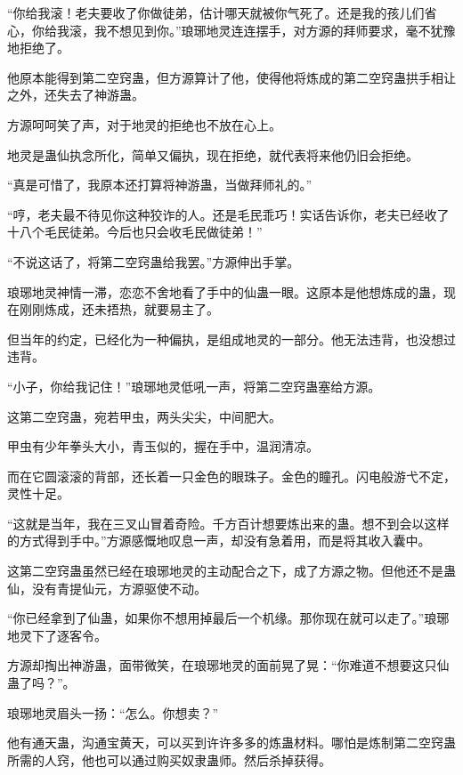 
\begin{this_body}

“你给我滚！老夫要收了你做徒弟，估计哪天就被你气死了。还是我的孩儿们省心，你给我滚，我不想见到你。”琅琊地灵连连摆手，对方源的拜师要求，毫不犹豫地拒绝了。

他原本能得到第二空窍蛊，但方源算计了他，使得他将炼成的第二空窍蛊拱手相让之外，还失去了神游蛊。

方源呵呵笑了声，对于地灵的拒绝也不放在心上。

地灵是蛊仙执念所化，简单又偏执，现在拒绝，就代表将来他仍旧会拒绝。

“真是可惜了，我原本还打算将神游蛊，当做拜师礼的。”

“哼，老夫最不待见你这种狡诈的人。还是毛民乖巧！实话告诉你，老夫已经收了十八个毛民徒弟。今后也只会收毛民做徒弟！”

“不说这话了，将第二空窍蛊给我罢。”方源伸出手掌。

琅琊地灵神情一滞，恋恋不舍地看了手中的仙蛊一眼。这原本是他想炼成的蛊，现在刚刚炼成，还未捂热，就要易主了。

但当年的约定，已经化为一种偏执，是组成地灵的一部分。他无法违背，也没想过违背。

“小子，你给我记住！”琅琊地灵低吼一声，将第二空窍蛊塞给方源。

这第二空窍蛊，宛若甲虫，两头尖尖，中间肥大。

甲虫有少年拳头大小，青玉似的，握在手中，温润清凉。

而在它圆滚滚的背部，还长着一只金色的眼珠子。金色的瞳孔。闪电般游弋不定，灵性十足。

“这就是当年，我在三叉山冒着奇险。千方百计想要炼出来的蛊。想不到会以这样的方式得到手中。”方源感慨地叹息一声，却没有急着用，而是将其收入囊中。

这第二空窍蛊虽然已经在琅琊地灵的主动配合之下，成了方源之物。但他还不是蛊仙，没有青提仙元，方源驱使不动。

“你已经拿到了仙蛊，如果你不想用掉最后一个机缘。那你现在就可以走了。”琅琊地灵下了逐客令。

方源却掏出神游蛊，面带微笑，在琅琊地灵的面前晃了晃：“你难道不想要这只仙蛊了吗？”。

琅琊地灵眉头一扬：“怎么。你想卖？”

他有通天蛊，沟通宝黄天，可以买到许许多多的炼蛊材料。哪怕是炼制第二空窍蛊所需的人窍，他也可以通过购买奴隶蛊师。然后杀掉获得。


\end{this_body}
